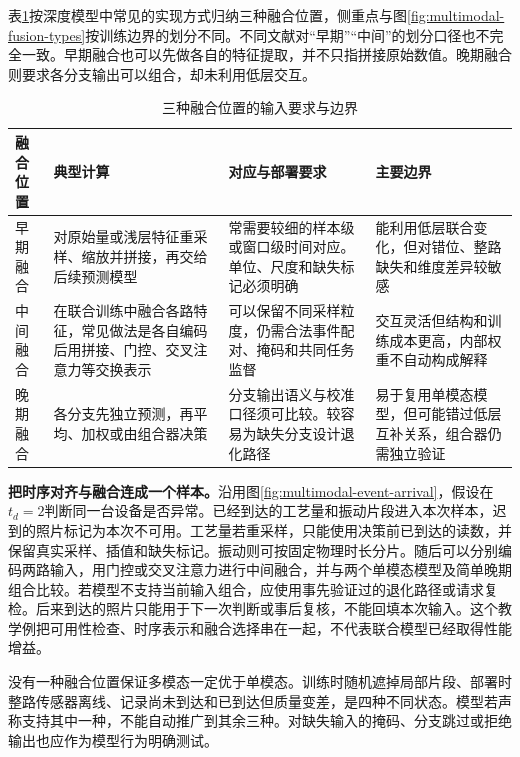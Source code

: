 表\ref{tab:multimodal-fusion-choices}按深度模型中常见的实现方式归纳三种融合位置，侧重点与图\ref{fig:multimodal-fusion-types}按训练边界的划分不同。不同文献对“早期”“中间”的划分口径也不完全一致。早期融合也可以先做各自的特征提取，并不只指拼接原始数值。晚期融合则要求各分支输出可以组合，却未利用低层交互。

\begin{table}[htbp]
\centering
\caption{三种融合位置的输入要求与边界}
\label{tab:multimodal-fusion-choices}
\footnotesize
\setlength{\tabcolsep}{2pt}
\begin{tabular}{@{}>{\raggedright\arraybackslash}m{1.7cm}>{\raggedright\arraybackslash}m{3.4cm}>{\raggedright\arraybackslash}m{3.7cm}>{\raggedright\arraybackslash}m{3.4cm}@{}}
\toprule
融合位置 & 典型计算 & 对应与部署要求 & 主要边界 \\
\midrule
早期融合 & 对原始量或浅层特征重采样、缩放并拼接，再交给后续预测模型 & 常需要较细的样本级或窗口级时间对应。单位、尺度和缺失标记必须明确 & 能利用低层联合变化，但对错位、整路缺失和维度差异较敏感 \\
中间融合 & 在联合训练中融合各路特征，常见做法是各自编码后用拼接、门控、交叉注意力等交换表示 & 可以保留不同采样粒度，仍需合法事件配对、掩码和共同任务监督 & 交互灵活但结构和训练成本更高，内部权重不自动构成解释 \\
晚期融合 & 各分支先独立预测，再平均、加权或由组合器决策 & 分支输出语义与校准口径须可比较。较容易为缺失分支设计退化路径 & 易于复用单模态模型，但可能错过低层互补关系，组合器仍需独立验证 \\
\bottomrule
\end{tabular}
\end{table}

\textbf{把时序对齐与融合连成一个样本。}沿用图\ref{fig:multimodal-event-arrival}，假设在$t_d=2$判断同一台设备是否异常。已经到达的工艺量和振动片段进入本次样本，迟到的照片标记为本次不可用。工艺量若重采样，只能使用决策前已到达的读数，并保留真实采样、插值和缺失标记。振动则可按固定物理时长分片。随后可以分别编码两路输入，用门控或交叉注意力进行中间融合，并与两个单模态模型及简单晚期组合比较。若模型不支持当前输入组合，应使用事先验证过的退化路径或请求复检。后来到达的照片只能用于下一次判断或事后复核，不能回填本次输入。这个教学例把可用性检查、时序表示和融合选择串在一起，不代表联合模型已经取得性能增益。

没有一种融合位置保证多模态一定优于单模态。训练时随机遮掉局部片段、部署时整路传感器离线、记录尚未到达和已到达但质量变差，是四种不同状态。模型若声称支持其中一种，不能自动推广到其余三种。对缺失输入的掩码、分支跳过或拒绝输出也应作为模型行为明确测试。

